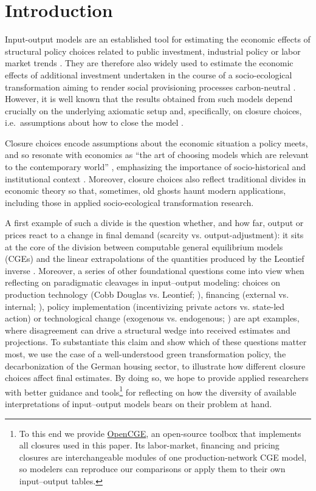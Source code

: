 \section{Introduction}\label{sec:intro}

Input-output models are an established tool for estimating the economic effects of structural policy choices related to public investment, industrial policy or labor market trends \citep{BlairMiller}. They are therefore also widely used to estimate the economic effects of additional investment undertaken in the course of a socio-ecological transformation aiming to render social provisioning processes carbon-neutral \citep{Leontief.1970, Hornykewycz.2025, Markandya.2016, Markaki.2013}. However, it is well known that the results obtained from such models depend crucially on the underlying axiomatic setup and, specifically, on closure choices, i.e.\ assumptions about how to close the model \citep{Robinson.2006, Rose.1995}.

Closure choices encode assumptions about the economic situation a policy meets, and so resonate with economics as ``the art of choosing models which are relevant to the contemporary world'' \citep{Keynes.1938}, emphasizing the importance of socio-historical and institutional context \citep{Polanyi.2001, Hodgson.2010}. Moreover, closure choices also reflect traditional divides in economic theory so that, sometimes, old ghosts haunt modern applications, including those in applied socio-ecological transformation research.

A first example of such a divide is the question whether, and how far, output or prices react to a change in final demand (scarcity vs. output-adjustment): it sits at the core of the division between computable general equilibrium models (CGEs) and the linear extrapolations of the quantities produced by the Leontief inverse \citep{Leontief.1936, BlairMiller}. Moreover, a series of other foundational questions come into view when reflecting on paradigmatic cleavages in input--output modeling: choices on production technology (Cobb Douglas vs. Leontief; \citealp{Labini.1995, Klump.2012, Leontief.1936}), financing (external vs. internal; \citealp{BlinderSolow.1973, Hein.2023}), policy implementation (incentivizing private actors vs. state-led action) or technological change (exogenous vs. endogenous; \citealp{Kaldor1961}) are apt examples, where disagreement can drive a structural wedge into received estimates and projections. To substantiate this claim and show which of these questions matter most, we use the case of a well-understood green transformation policy, the decarbonization of the German housing sector, to illustrate how different closure choices affect final estimates. By doing so, we hope to provide applied researchers with better guidance and tools\footnote{To this end we provide \href{https://github.com/theplatters/OpenCGE}{OpenCGE}, an open-source toolbox that implements all closures used in this paper. Its labor-market, financing and pricing closures are interchangeable modules of one production-network CGE model, so modelers can reproduce our comparisons or apply them to their own input--output tables.} for reflecting on how the diversity of available interpretations of input--output models bears on their problem at hand.

